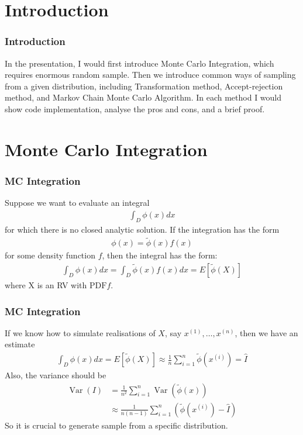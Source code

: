 \frame[plain]{\titlepage}

\section{Introduction}

\begin{frame}
    \frametitle{Introduction}
    
    In the presentation, I would first introduce Monte Carlo Integration, which requires enormous random sample. Then we introduce common ways of sampling from a given distribution, including Transformation method, Accept-rejection method, and Markov Chain Monte Carlo Algorithm. In each method I would show code implementation, analyse the pros and cons, and a brief proof.
    
\end{frame}
\section[MC Integration]{Monte Carlo Integration}
\begin{frame}
    \frametitle{MC Integration}
    Suppose we want to evaluate an integral
    \begin{align*}
    \int_D \phi(x) d x
    \end{align*}
    for which there is no closed analytic solution. If the integration has the form
    \begin{align*}
    \phi(x)=\tilde{\phi}(x) f(x)
    \end{align*}
    for some density function \(f\), then the integral has the form:
    \begin{align*}
    \int_D \phi(x) d x=\int_D \tilde{\phi}(x) f(x) d x=E[\tilde{\phi}(X)]
    \end{align*}
    where \(\mathrm{X}\) is an RV with \(\mathrm{PDF} f\). 

    

\end{frame}
\begin{frame}
    \frametitle{MC Integration}
    If we know how to simulate realisations of \(X\), say \(x^{(1)}, \ldots, x^{(n)}\), then we have an estimate
    \begin{align*}
    \int_D \phi(x) d x=E[\tilde{\phi}(X)] \approx \frac{1}{n} \sum_{i=1}^n \tilde{\phi}\left(x^{(i)}\right)=\hat{I}
    \end{align*}
    Also, the variance should be
    \begin{align*}
        \operatorname{Var}(I) &= \frac{1}{n^2} \sum_{i=1}^n \operatorname{Var}\left(\tilde{\phi}\left(x\right)\right) \\
        &\approx \frac{1}{n(n-1)} \sum_{i=1}^n \left(\tilde{\phi}\left(x^{(i)}\right) - \hat I\right)
    \end{align*}
    So it is crucial to generate sample from a specific distribution.

    

\end{frame}
